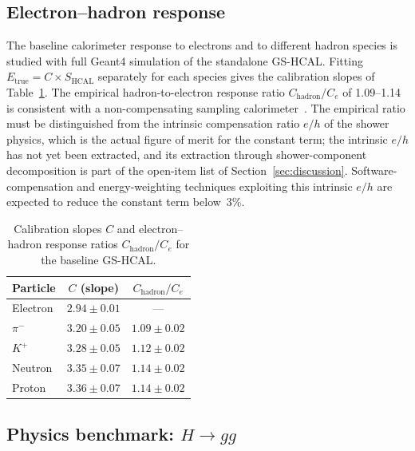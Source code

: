 \subsection{Electron--hadron response}
\label{subsec:eresponse}

The baseline calorimeter response to electrons and to different
hadron species is studied with full Geant4 simulation of the
standalone GS-HCAL\@.
Fitting $E_{\mathrm{true}}=C\times S_{\mathrm{HCAL}}$ separately for
each species gives the calibration slopes of
Table~\ref{tab:eoverh_hcal}.
The empirical hadron-to-electron response ratio
$C_{\mathrm{hadron}}/C_{e}$ of 1.09--1.14 is consistent with a
non-compensating sampling calorimeter~\cite{Akchurin:2012zz}.
The empirical ratio must be distinguished from the intrinsic
compensation ratio $e/h$ of the shower physics, which is the actual
figure of merit for the constant term; the intrinsic $e/h$ has not
yet been extracted, and its extraction through shower-component
decomposition is part of the open-item list of
Section~\ref{sec:discussion}.
Software-compensation and energy-weighting techniques
exploiting this intrinsic $e/h$ are expected to reduce the constant
term below~3\%.

\begin{table}[htbp]
\centering
\caption{Calibration slopes $C$ and electron--hadron response ratios
$C_{\mathrm{hadron}}/C_{e}$ for the baseline GS-HCAL\@.}
\label{tab:eoverh_hcal}
\begin{tabular}{lcc}
\toprule
Particle & $C$ (slope) & $C_{\mathrm{hadron}}/C_{e}$ \\
\midrule
Electron  & $2.94\pm0.01$ & ---            \\
$\pi^{-}$ & $3.20\pm0.05$ & $1.09\pm0.02$ \\
$K^{+}$   & $3.28\pm0.05$ & $1.12\pm0.02$ \\
Neutron   & $3.35\pm0.07$ & $1.14\pm0.02$ \\
Proton    & $3.36\pm0.07$ & $1.14\pm0.02$ \\
\bottomrule
\end{tabular}
\end{table}

\subsection{Physics benchmark: $H\to gg$}
\label{subsec:physperf}

